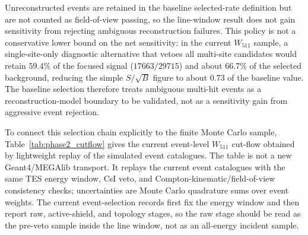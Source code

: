 \documentclass[11pt]{article}
\newcommand{\wii}{W_{511}}
\newcommand{\added}[1]{{\color{red}#1}}
\begin{document}
Unreconstructed events are retained in the baseline selected-rate definition but
are not counted as field-of-view passing, so the line-window result does not gain
sensitivity from rejecting ambiguous reconstruction failures. This policy is not
a conservative lower bound on the net sensitivity: in the current $\wii$ sample,
a single-site-only diagnostic alternative that vetoes all multi-site candidates
would retain $59.4\%$ of the focused signal ($17663/29715$) and about $66.7\%$ of
the selected background, reducing the simple $S/\sqrt{B}$ figure to about $0.73$
of the baseline value. The baseline selection therefore treats ambiguous
multi-hit events as a reconstruction-model boundary to be validated, not as a
sensitivity gain from aggressive event rejection.

\added{To connect this selection chain explicitly to the finite Monte Carlo
sample, Table~\ref{tab:phase2_cutflow} gives the current event-level
$\wii$ cut-flow obtained by lightweight replay of the simulated event catalogues.
The table is not a new Geant4/MEGAlib transport. It replays the current
event catalogues with the same TES energy window, CsI veto, and
Compton-kinematic/field-of-view consistency checks; uncertainties are Monte
Carlo quadrature sums over event weights. The current event-selection records first fix
the energy window and then report raw, active-shield, and topology stages, so
the raw stage should be read as the pre-veto sample inside the line window, not
as an all-energy incident sample.}
\end{document}
